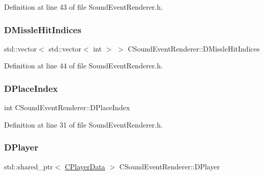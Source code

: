 Definition at line 43 of file Sound\+Event\+Renderer.\+h.

\hypertarget{classCSoundEventRenderer_aa551953be1c1e7926432996c78c6d8d8}{}\label{classCSoundEventRenderer_aa551953be1c1e7926432996c78c6d8d8} 
\subsubsection{\texorpdfstring{D\+Missle\+Hit\+Indices}{DMissleHitIndices}}
{\footnotesize\ttfamily std\+::vector$<$ std\+::vector$<$ int $>$ $>$ C\+Sound\+Event\+Renderer\+::\+D\+Missle\+Hit\+Indices\hspace{0.3cm}{\ttfamily [protected]}}



Definition at line 44 of file Sound\+Event\+Renderer.\+h.

\hypertarget{classCSoundEventRenderer_a0ca919430ff2fb57324c0ee712c5b7b1}{}\label{classCSoundEventRenderer_a0ca919430ff2fb57324c0ee712c5b7b1} 
\subsubsection{\texorpdfstring{D\+Place\+Index}{DPlaceIndex}}
{\footnotesize\ttfamily int C\+Sound\+Event\+Renderer\+::\+D\+Place\+Index\hspace{0.3cm}{\ttfamily [protected]}}



Definition at line 31 of file Sound\+Event\+Renderer.\+h.

\hypertarget{classCSoundEventRenderer_ad98889d7f52477a2e148d7e390641d51}{}\label{classCSoundEventRenderer_ad98889d7f52477a2e148d7e390641d51} 
\subsubsection{\texorpdfstring{D\+Player}{DPlayer}}
{\footnotesize\ttfamily std\+::shared\+\_\+ptr$<$ \hyperlink{classCPlayerData}{C\+Player\+Data} $>$ C\+Sound\+Event\+Renderer\+::\+D\+Player\hspace{0.3cm}{\ttfamily [protected]}}



